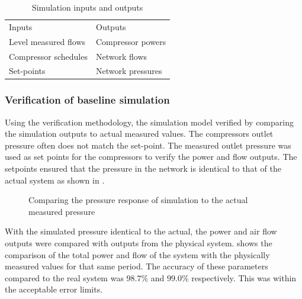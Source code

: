 \begin{table}[h!]
	\centering
	\begin{tabular}{ll}
		\hline 
		Inputs \hspace*{4cm} & Outputs \hspace*{4cm} \\ \hhline{==}
		Level measured flows & Compressor powers \\
		Compressor schedules & Network flows \\
		Set-points & Network pressures \\
		\hline
	\end{tabular}
		\caption{Simulation inputs and outputs}
\label{table: Mine B inputs/outputs}
\end{table}
	
	\subsubsection{Verification of baseline simulation}
	Using the verification methodology, the simulation model verified by comparing the simulation outputs to actual measured values. The compressors outlet pressure often does not match the set-point. The measured outlet pressure was used as set points for the compressors to verify the power and flow outputs. The setpoints ensured that the pressure in the network is identical to that of the actual system as shown in .
	\par 
	\begin{figure}[h!]
		\centering
		
		\caption{Comparing the pressure response of simulation to the actual measured pressure}
		\label{fig: Verification Pressure kusasalethu}
	\end{figure}

 With the simulated pressure identical to the actual, the power and air flow outputs were compared with outputs from the physical system.  shows the comparison of the total power and flow of the system with the physically measured values for that same period. The accuracy of these parameters compared to the real system was $98.7 \%$ and $99.0 \%$ respectively. This was within the acceptable error limits.
 
